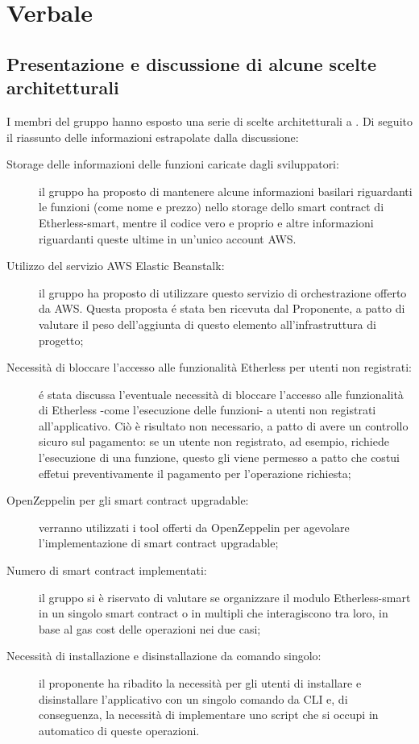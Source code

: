 \section{Verbale}
\subsection{Presentazione e discussione di alcune scelte architetturali}
I membri del gruppo hanno esposto una serie di scelte architetturali a \Proponente.
Di seguito il riassunto delle informazioni estrapolate dalla discussione:
\begin{description}
	\item [Storage delle informazioni delle funzioni caricate dagli sviluppatori:] il gruppo ha proposto di mantenere alcune informazioni basilari riguardanti le funzioni (come nome e prezzo) nello storage dello smart contract di Etherless-smart, mentre il codice vero e proprio e altre informazioni riguardanti queste ultime in un'unico account AWS.
	\item [Utilizzo del servizio AWS Elastic Beanstalk:] il gruppo ha proposto di utilizzare questo servizio di orchestrazione offerto da AWS. Questa proposta é stata ben ricevuta dal Proponente, a patto di valutare il peso dell'aggiunta di questo elemento all'infrastruttura di progetto;
	\item [Necessità di bloccare l'accesso alle funzionalità Etherless per utenti non registrati:] é stata discussa l'eventuale necessità di bloccare l'accesso alle funzionalità di Etherless -come l'esecuzione delle funzioni- a utenti non registrati all'applicativo. Ciò è risultato non necessario, a patto di avere un controllo sicuro sul pagamento: se un utente non registrato, ad esempio, richiede l'esecuzione di una funzione, questo gli viene permesso a patto che costui effetui preventivamente il pagamento per l'operazione richiesta;
	\item [OpenZeppelin per gli smart contract upgradable:] verranno utilizzati i tool offerti da OpenZeppelin per agevolare l'implementazione di smart contract upgradable;
	\item [Numero di smart contract implementati:] il gruppo si è riservato di valutare se organizzare il modulo Etherless-smart in un singolo smart contract o in multipli che interagiscono tra loro, in base al gas cost delle operazioni nei due casi;
	\item [Necessità di installazione e disinstallazione da comando singolo:] il proponente ha ribadito la necessità per gli utenti di installare e disinstallare l'applicativo con un singolo comando da CLI e, di conseguenza, la necessità di implementare uno script che si occupi in automatico di queste operazioni.
\end{description}
